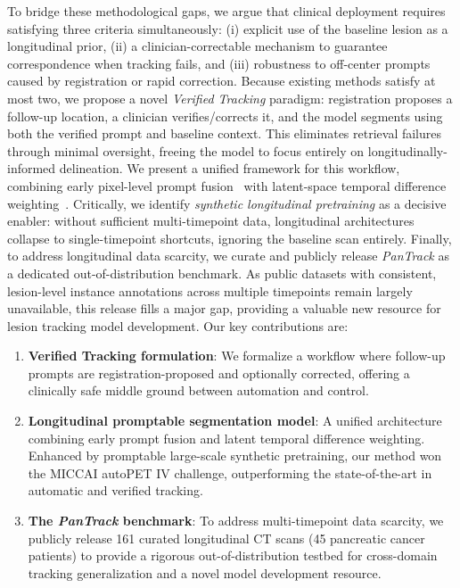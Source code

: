 \noindent To bridge these methodological gaps, we argue that clinical deployment requires satisfying three criteria simultaneously: (i) explicit use of the baseline lesion as a longitudinal prior, (ii) a clinician-correctable mechanism to guarantee correspondence when tracking fails, and (iii) robustness to off-center prompts caused by registration or rapid correction. Because existing methods satisfy at most two, we propose a novel \textit{Verified Tracking} paradigm: registration proposes a follow-up location, a clinician verifies/corrects it, and the model segments using both the verified prompt and baseline context. This eliminates retrieval failures through minimal oversight, freeing the model to focus entirely on longitudinally-informed delineation. We present a unified framework for this workflow, combining early pixel-level prompt fusion~\cite{nnInteractive} with latent-space temporal difference weighting~\cite{longiseg}. Critically, we identify \textit{synthetic longitudinal pretraining} as a decisive enabler: without sufficient multi-timepoint data, longitudinal architectures collapse to single-timepoint shortcuts, ignoring the baseline scan entirely. Finally, to address longitudinal data scarcity, we curate and publicly release \textit{PanTrack} as a dedicated out-of-distribution benchmark. As public datasets with consistent, lesion-level instance annotations across multiple timepoints remain largely unavailable, this release fills a major gap, providing a valuable new resource for lesion tracking model development. Our key contributions are:

\begin{enumerate}
    \item \textbf{Verified Tracking formulation}: We formalize a workflow where follow-up prompts are registration-proposed and optionally corrected, offering a clinically safe middle ground between automation and control.
    \item \textbf{Longitudinal promptable segmentation model}: A unified architecture combining early prompt fusion and latent temporal difference weighting. Enhanced by promptable large-scale synthetic pretraining, our method won the MICCAI autoPET IV challenge, outperforming the state-of-the-art in automatic and verified tracking.
    \item \textbf{The \textit{PanTrack} benchmark}: To address multi-timepoint data scarcity, we publicly release 161 curated longitudinal CT scans (45 pancreatic cancer patients) to provide a rigorous out-of-distribution testbed for cross-domain tracking generalization and a novel model development resource.
\end{enumerate}

